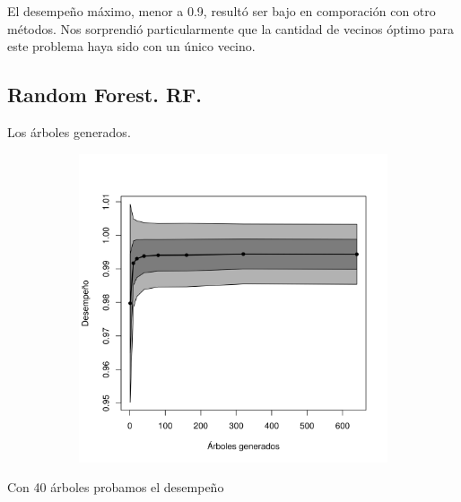 \documentclass[a4paper,10pt]{article}
\begin{document}
El desempeño m\'aximo, menor a 0.9, result\'o ser bajo en comporaci\'on con otro m\'etodos. Nos sorprendi\'o particularmente que la cantidad de vecinos \'optimo para este problema haya sido con un \'unico vecino. 




\subsection{Random Forest. RF.}

Los \'arboles generados. 

\begin{figure}[H]
  \centering
  \begin{subfigure}[b]{0.4\textwidth}
    \includegraphics[width=\textwidth]{../imagenes/rf_estimators}
     \caption{}
  \end{subfigure}
  \label{fig:rf_estimators}
\end{figure}

Con 40 \'arboles probamos el desempeño 
\end{document}
